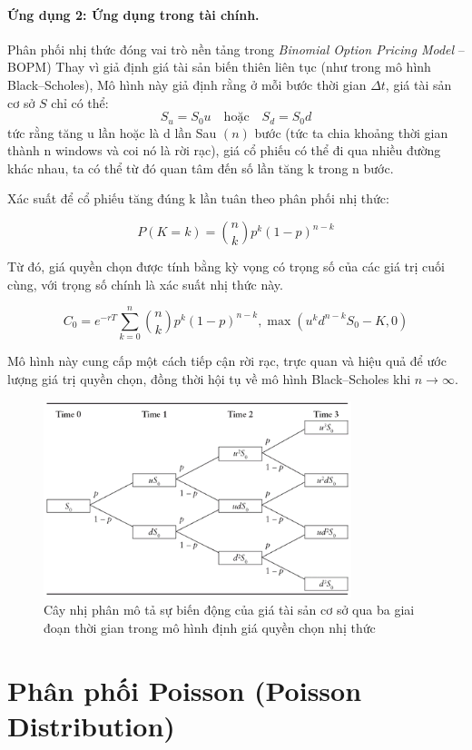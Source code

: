 \paragraph{Ứng dụng 2: Ứng dụng trong tài chính.} 
Phân phối nhị thức đóng vai trò nền tảng trong  
\textit{Binomial Option Pricing Model} – BOPM)  
Thay vì giả định giá tài sản biến thiên liên tục (như trong mô hình Black–Scholes), 
Mô hình này giả định rằng ở mỗi bước thời gian $\Delta t$, giá tài sản cơ sở $S$ chỉ có thể:
\[
S_u = S_0 u \quad \text{hoặc} \quad S_d = S_0 d
\]
tức rằng tăng u lần hoặc là d lần
Sau $( n )$ bước (tức ta chia khoảng thời gian thành n windows và coi nó là rời rạc),
 giá cổ phiếu có thể đi qua nhiều đường khác nhau, ta có thể từ đó quan tâm đến
số lần tăng  k  trong  n  bước.

Xác suất để cổ phiếu tăng đúng  k  lần tuân theo phân phối nhị thức:

$$
P(K = k) = \binom{n}{k} p^k (1 - p)^{n-k}
$$

Từ đó, giá quyền chọn được tính bằng kỳ vọng có trọng số của các giá trị cuối cùng, với trọng số chính là xác suất nhị thức này.

$$
C_0 = e^{-rT} \sum_{k=0}^{n} \binom{n}{k} p^k (1 - p)^{n-k} , \max(u^k d^{n-k} S_0 - K, 0)
$$

Mô hình này cung cấp một cách tiếp cận rời rạc, trực quan và hiệu quả để ước lượng giá trị quyền chọn, 
đồng thời hội tụ về mô hình Black–Scholes khi $n \to \infty$.

\begin{figure}[h!]
    \centering
    \includegraphics[width=0.8\textwidth]{images/BOCM.png}
    \caption{Cây nhị phân mô tả sự biến động của giá tài sản cơ sở 
    qua ba giai đoạn thời gian trong mô hình định giá quyền chọn nhị thức}
    \label{fig:BOPM}
\end{figure}

\newpage
\section{Phân phối Poisson (Poisson Distribution)}

